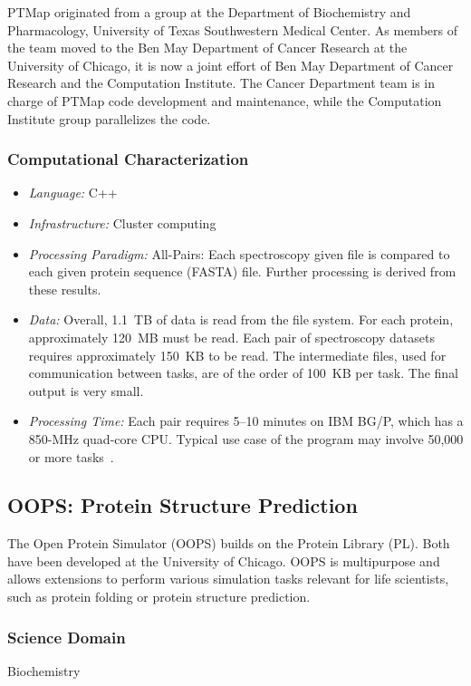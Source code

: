 \documentclass[10pt,letterpaper]{article}
\begin{document}
PTMap originated from a group at the Department of Biochemistry and
Pharmacology, University of Texas Southwestern Medical Center. As
members of the team moved to the Ben May Department of Cancer Research
at the University of Chicago, it is now a joint effort of Ben May
Department of Cancer Research and the Computation Institute. The
Cancer Department team is in charge of PTMap code development and
maintenance, while the Computation Institute group parallelizes the
code.

\subsubsection{Computational Characterization}
\begin {itemize}
\item {\em Language:} C++
\item {\em Infrastructure:} Cluster computing
\item {\em Processing Paradigm:} All-Pairs: Each spectroscopy given
  file is compared to each given protein sequence (FASTA) file.
  Further processing is derived from these results.
\item {\em Data:} Overall, 1.1~TB of data is read from the file system.
  For each protein, approximately 120~MB must be read. Each pair of
  spectroscopy datasets requires approximately 150~KB to be read.  The
  intermediate files, used for communication between tasks, are of the
  order of 100~KB per task.  The final output is very small.
\item {\em Processing Time:} Each pair requires 5--10 minutes on IBM BG/P, which has a 850-MHz quad-core CPU.  
Typical use case of the program may involve 50,000 or more
  tasks~\cite{wozniak09petascalestorage}.
\end{itemize}

\subsection{OOPS: Protein Structure Prediction}

The Open Protein Simulator (OOPS) builds on the Protein Library (PL).
Both have been developed at the University of Chicago.
OOPS is multipurpose and allows extensions to perform various simulation tasks
relevant for life scientists, such as protein folding or protein structure prediction.

\subsubsection{Science Domain} Biochemistry
\end{document}
